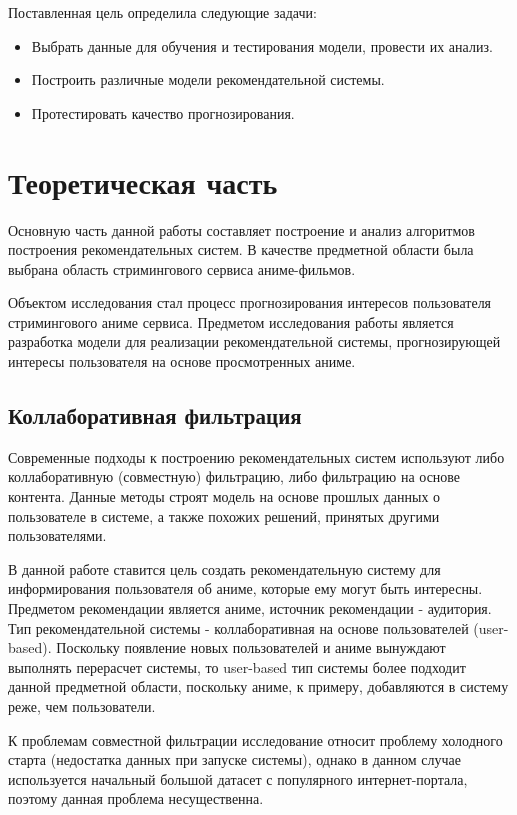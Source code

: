 \documentclass[bachelor, och, diploma]{SCWorks}
\begin{document}
Поставленная цель определила следующие задачи:
\begin{itemize}
	\item Выбрать данные для обучения и тестирования модели, провести их анализ.
	\item Построить различные модели рекомендательной системы.
	\item Протестировать качество прогнозирования.
\end{itemize}

\section{Теоретическая часть}
Основную часть данной работы составляет построение и анализ алгоритмов построения рекомендательных систем. В качестве предметной области была выбрана область стримингового сервиса аниме-фильмов.

Объектом исследования стал процесс прогнозирования интересов пользователя стримингового аниме сервиса. Предметом исследования работы является разработка модели для реализации рекомендательной системы, прогнозирующей интересы пользователя на основе просмотренных аниме.

\subsection{Коллаборативная фильтрация}
Современные подходы к построению рекомендательных систем используют либо коллаборативную (совместную) фильтрацию, либо фильтрацию на основе контента. Данные методы строят модель на основе прошлых данных о пользователе в системе, а также похожих решений, принятых другими пользователями.

В данной работе ставится цель создать рекомендательную систему для информирования пользователя об аниме, которые ему могут быть интересны. Предметом рекомендации является аниме, источник рекомендации - аудитория. Тип рекомендательной системы - коллаборативная на основе пользователей (user-based). Поскольку появление новых пользователей и аниме вынуждают выполнять перерасчет системы, то user-based тип системы более подходит данной предметной области, поскольку аниме, к примеру, добавляются в систему реже, чем пользователи.

К проблемам совместной фильтрации исследование \cite{bobadilla2012collaborative} 
относит проблему холодного старта (недостатка данных при запуске системы), 
однако в данном случае используется начальный большой датасет с популярного 
интернет-портала, поэтому данная проблема несущественна.
\end{document}

